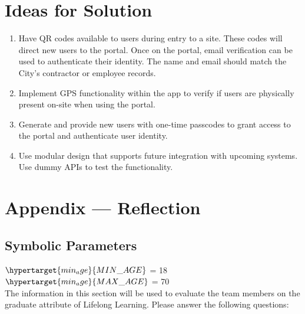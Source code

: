 \documentclass[12pt]{article}
\begin{document}
\section{Ideas for Solution}
\begin{enumerate}
  \item Have QR codes available to users during entry to a site. These codes will direct new users to the portal. Once on the portal, email verification can be used to authenticate their identity. The name and email should match the City's contractor or employee records.
  \item Implement GPS functionality within the app to verify if users are physically present on-site when using the portal. 
  \item Generate and provide new users with one-time passcodes to grant access to the portal and authenticate user identity.
  \item Use modular design that supports future integration with upcoming systems. Use dummy APIs to test the functionality.
\end{enumerate}

\newpage{}
\section*{Appendix --- Reflection}
\subsection{Symbolic Parameters}
$\hypertarget{min_age}{MIN\_AGE}$ = 18\\
$\hypertarget{min_age}{MAX\_AGE}$ = 70\\

The information in this section will be used to evaluate the team members on the
graduate attribute of Lifelong Learning.  Please answer the following questions:
\end{document}
